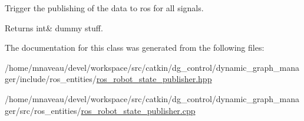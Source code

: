Trigger the publishing of the data to ros for all signals. 

\begin{DoxyReturn}{Returns}
int\& dummy stuff. 
\end{DoxyReturn}


The documentation for this class was generated from the following files\+:\begin{DoxyCompactItemize}
\item 
/home/mnaveau/devel/workspace/src/catkin/dg\+\_\+control/dynamic\+\_\+graph\+\_\+manager/include/ros\+\_\+entities/\hyperlink{ros__robot__state__publisher_8hpp}{ros\+\_\+robot\+\_\+state\+\_\+publisher.\+hpp}\item 
/home/mnaveau/devel/workspace/src/catkin/dg\+\_\+control/dynamic\+\_\+graph\+\_\+manager/src/ros\+\_\+entities/\hyperlink{ros__robot__state__publisher_8cpp}{ros\+\_\+robot\+\_\+state\+\_\+publisher.\+cpp}\end{DoxyCompactItemize}
